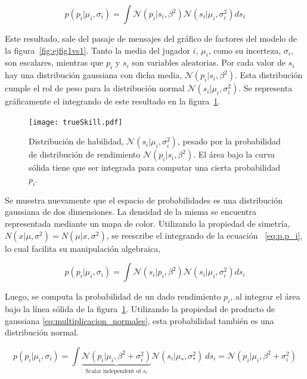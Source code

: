 \documentclass[11pt,twoside,spanish]{report} %
\begin{document}
\begin{equation}\label{eq:p.p_i}
p(p_i|\mu_i,\sigma_i) = \int \mathcal{N}(p_i| s_i, \beta^2)\mathcal{N}(s_i|\mu_i,\sigma_i^2) ds_i
\end{equation}

Este resultado, sale del pasaje de mensajes del gr\'afico de factores del modelo de la figura~\ref{fig:ejfig1vs1}. 
Tanto la media del jugador $i$, $\mu_i$, como su incerteza, $\sigma_i$, son escalares, mientras que  $p_i$ y $s_i$ son variables aleatorias.
Por cada valor de $s_i$ hay una distribuci\'on gaussiana con dicha media, $\mathcal{N}(p_i| s_i, \beta^2)$.
Esta distribuci\'on cumple el rol de peso para la distribuci\'on normal  $\mathcal{N}(s_i|\mu_i,\sigma_i^2)$.
Se representa gr\'aficamente el integrando de este resultado en la figura~\ref{fig:fig8}.

\begin{figure}[H]
	\centering
	\texttt{[image: trueSkill.pdf]}
	\caption{Distribuci\'on de habilidad, $\mathcal{N}(s_i|\mu_i,\sigma_i^2)$, pesado por la probabilidad de distribuci\'on de rendimiento $\mathcal{N}(p_i|s_i,\beta^2)$. El \'area bajo la curva s\'olida tiene que ser integrada para computar una cierta probabilidad $p_i$.}
	\label{fig:fig8}
\end{figure}

Se muestra nuevamente que el espacio de probabilidades es una distribuci\'on gaussiana de dos dimensiones.
La densidad de la misma se encuentra representada mediante un mapa de color.
Utilizando la propiedad de simetr\'ia, $ N (x| \mu, \sigma^2) = N (\mu| x, \sigma^2)$, se reescribe el integrando de la ecuaci\'on ~\ref{eq:p.p_i}, lo cual facilita su manipulaci\'on algebraica,

\begin{equation}\label{eq:rend}
p(p_i|\mu_i,\sigma_i) = \int \mathcal{N}(s_i| p_i, \beta^2)\mathcal{N}(s_i|\mu_i,\sigma_i^2) ds_i
\end{equation}


Luego, se computa la probabilidad de un dado rendimiento $p_i$, al integrar el \'area bajo la l\'inea s\'olida de la figura~\ref{fig:fig8}.
Utilizando la propiedad de producto de gaussiana \ref{eq:multiplicacion_normales}, esta probabilidad tambi\'en es una distribuci\'on normal.

\begin{equation}\label{eq:probrend}
p(p_i|\mu_i,\sigma_i) = \int \underbrace{\mathcal{N}(p_i|\mu_i,\beta^2 + \sigma_i^2)}_{\text{Scalar independent of $s_i$}} \mathcal{N}(s_i|\mu_{*},\sigma_{*}^2)  \ ds_i  = \mathcal{N}(p_i|\mu_i,\beta^2 + \sigma_i^2)
\end{equation}
\end{document}
